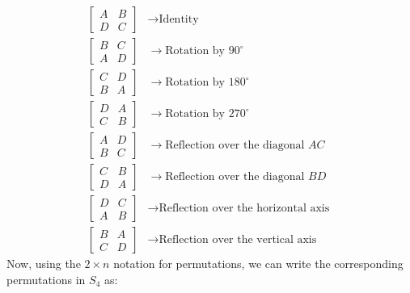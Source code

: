\documentclass[12pt, letterpaper, twoside]{report}
\begin{document}
$$
\begin{aligned}
\begin{bmatrix}
A & B \\
D & C
\end{bmatrix} & \rightarrow \text{Identity} \\
\begin{bmatrix}
B & C \\
A & D
\end{bmatrix} & \rightarrow \text{Rotation by } 90^\circ \\
\begin{bmatrix}
C & D \\
B & A
\end{bmatrix} & \rightarrow \text{Rotation by } 180^\circ \\
\begin{bmatrix}
D & A \\
C & B
\end{bmatrix} & \rightarrow \text{Rotation by } 270^\circ \\
\begin{bmatrix}
A & D \\
B & C
\end{bmatrix} & \rightarrow \text{Reflection over the diagonal } AC \\
\begin{bmatrix}
C & B \\
D & A
\end{bmatrix} & \rightarrow \text{Reflection over the diagonal } BD \\
\begin{bmatrix}
D & C \\
A & B
\end{bmatrix} & \rightarrow \text{Reflection over the horizontal axis } \\
\begin{bmatrix}
B & A \\
C & D
\end{bmatrix} & \rightarrow \text{Reflection over the vertical axis }
\end{aligned}
$$
Now, using the $2 \times n$ notation for permutations, we can write the corresponding permutations in $S_4$ as:
\end{document}

